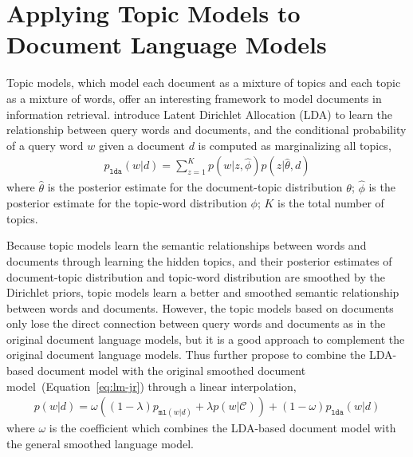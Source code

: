 
\section{Applying Topic Models to Document Language Models}

Topic models, which model each document as a mixture of topics and
each topic as a mixture of words, offer an interesting framework to
model documents in information retrieval. \cite{wei-06} introduce
Latent Dirichlet Allocation (LDA) to learn the relationship between
query words and documents, and the conditional probability of a query
word $w$ given a document $d$ is computed as marginalizing all topics,
\begin{align}
p_{\texttt{lda}}(w|d) = \sum_{z=1}^K p(w|z, \hat{\phi}) p(z |
\hat{\theta}, d)
\end{align}
where $\hat{\theta}$ is the posterior estimate for the document-topic distribution $\theta$; $\hat{\phi}$ is the posterior estimate for the topic-word distribution $\phi$; $K$ is the total number of topics.

Because topic models learn the semantic relationships between words
and documents through learning the hidden topics, and their posterior
estimates of document-topic distribution and topic-word distribution
are smoothed by the Dirichlet priors, topic models learn a better and
smoothed semantic relationship between words and documents. However,
the topic models based on documents only lose the direct connection
between query words and documents as in the original document language
models, but it is a good approach to complement the original document
language models. Thus \cite{wei-06} further propose to combine the
LDA-based document model with the original smoothed document
model~(Equation~\ref{eq:lm-jr}) through a linear interpolation,
\begin{align}
p(w|d) = \omega ((1 - \lambda) p_{\texttt{ml}(w|d)} + \lambda
p(w|\mathcal{C})) + (1 - \omega) p_{\texttt{lda}}(w|d)
\end{align}
where $\omega$ is the coefficient which combines the LDA-based
document model with the general smoothed language model.

